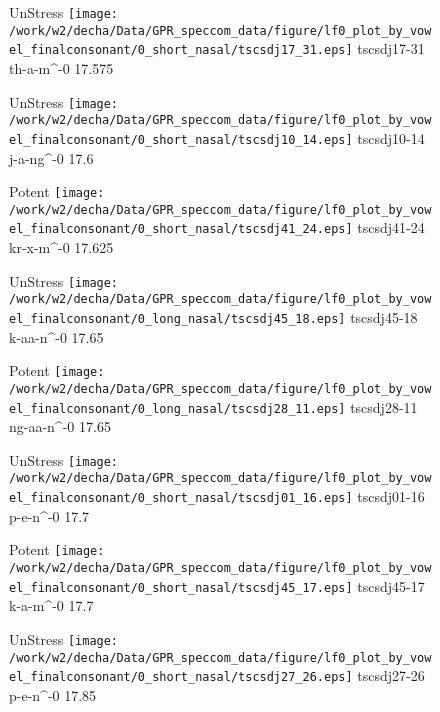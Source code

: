 \documentclass{article}
\begin{document}
\begin{figure}[t]
\begin{minipage}[b]{.24\textwidth}
UnStress
\centering
\texttt{[image: /work/w2/decha/Data/GPR\_speccom\_data/figure/lf0\_plot\_by\_vowel\_finalconsonant/0\_short\_nasal/tscsdj17\_31.eps]}
tscsdj17-31 th-a-m\textasciicircum-0 17.575
\end{minipage}
\begin{minipage}[b]{.24\textwidth}
UnStress
\centering
\texttt{[image: /work/w2/decha/Data/GPR\_speccom\_data/figure/lf0\_plot\_by\_vowel\_finalconsonant/0\_short\_nasal/tscsdj10\_14.eps]}
tscsdj10-14 j-a-ng\textasciicircum-0 17.6
\end{minipage}
\begin{minipage}[b]{.24\textwidth}
\colorbox{Apricot}{Potent}
\centering
\texttt{[image: /work/w2/decha/Data/GPR\_speccom\_data/figure/lf0\_plot\_by\_vowel\_finalconsonant/0\_short\_nasal/tscsdj41\_24.eps]}
tscsdj41-24 kr-x-m\textasciicircum-0 17.625
\end{minipage}
\begin{minipage}[b]{.24\textwidth}
UnStress
\centering
\texttt{[image: /work/w2/decha/Data/GPR\_speccom\_data/figure/lf0\_plot\_by\_vowel\_finalconsonant/0\_long\_nasal/tscsdj45\_18.eps]}
tscsdj45-18 k-aa-n\textasciicircum-0 17.65
\end{minipage}
\end{figure}

\begin{figure}[t]
\begin{minipage}[b]{.24\textwidth}
\colorbox{Apricot}{Potent}
\centering
\texttt{[image: /work/w2/decha/Data/GPR\_speccom\_data/figure/lf0\_plot\_by\_vowel\_finalconsonant/0\_long\_nasal/tscsdj28\_11.eps]}
tscsdj28-11 ng-aa-n\textasciicircum-0 17.65
\end{minipage}
\begin{minipage}[b]{.24\textwidth}
UnStress
\centering
\texttt{[image: /work/w2/decha/Data/GPR\_speccom\_data/figure/lf0\_plot\_by\_vowel\_finalconsonant/0\_short\_nasal/tscsdj01\_16.eps]}
tscsdj01-16 p-e-n\textasciicircum-0 17.7
\end{minipage}
\begin{minipage}[b]{.24\textwidth}
\colorbox{Apricot}{Potent}
\centering
\texttt{[image: /work/w2/decha/Data/GPR\_speccom\_data/figure/lf0\_plot\_by\_vowel\_finalconsonant/0\_short\_nasal/tscsdj45\_17.eps]}
tscsdj45-17 k-a-m\textasciicircum-0 17.7
\end{minipage}
\begin{minipage}[b]{.24\textwidth}
UnStress
\centering
\texttt{[image: /work/w2/decha/Data/GPR\_speccom\_data/figure/lf0\_plot\_by\_vowel\_finalconsonant/0\_short\_nasal/tscsdj27\_26.eps]}
tscsdj27-26 p-e-n\textasciicircum-0 17.85
\end{minipage}
\end{figure}
\end{document}
